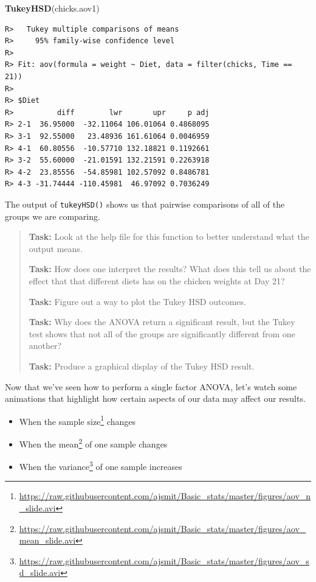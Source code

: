 \documentclass[english,10pt,a4paper,oneside]{book}
\renewcommand{\href}[2]{#2\footnote{\url{#1}}}
\let\rmarkdownfootnote\footnote%
\def\footnote{\protect\rmarkdownfootnote}
\providecommand{\tightlist}{%
  \setlength{\itemsep}{0pt}\setlength{\parskip}{0pt}}
\newenvironment{Shaded}{\begin{snugshade}}{\end{snugshade}}
\newcommand{\KeywordTok}[1]{\textcolor[rgb]{0.13,0.29,0.53}{\textbf{#1}}}
\newcommand{\NormalTok}[1]{#1}
\theoremstyle{definition}
\theoremstyle{definition}
\theoremstyle{definition}
\theoremstyle{remark}
\begin{document}
\begin{Shaded}
\begin{Highlighting}[]
\KeywordTok{TukeyHSD}\NormalTok{(chicks.aov1)}
\end{Highlighting}
\end{Shaded}

\begin{verbatim}
R>   Tukey multiple comparisons of means
R>     95% family-wise confidence level
R> 
R> Fit: aov(formula = weight ~ Diet, data = filter(chicks, Time == 21))
R> 
R> $Diet
R>          diff        lwr       upr     p adj
R> 2-1  36.95000  -32.11064 106.01064 0.4868095
R> 3-1  92.55000   23.48936 161.61064 0.0046959
R> 4-1  60.80556  -10.57710 132.18821 0.1192661
R> 3-2  55.60000  -21.01591 132.21591 0.2263918
R> 4-2  23.85556  -54.85981 102.57092 0.8486781
R> 4-3 -31.74444 -110.45981  46.97092 0.7036249
\end{verbatim}

The output of \texttt{tukeyHSD()} shows us that pairwise comparisons of
all of the groups we are comparing.

\begin{quote}
\textbf{Task:} Look at the help file for this function to better
understand what the output means.

\textbf{Task:} How does one interpret the results? What does this tell
us about the effect that that different diets has on the chicken weights
at Day 21?

\textbf{Task:} Figure out a way to plot the Tukey HSD outcomes.

\textbf{Task:} Why does the ANOVA return a significant result, but the
Tukey test shows that not all of the groups are significantly different
from one another?

\textbf{Task:} Produce a graphical display of the Tukey HSD result.
\end{quote}

Now that we've seen how to perform a single factor ANOVA, let's watch
some animations that highlight how certain aspects of our data may
affect our results.

\begin{itemize}
\tightlist
\item
  When the
  \href{https://raw.githubusercontent.com/ajsmit/Basic_stats/master/figures/aov_n_slide.avi}{sample
  size} changes
\item
  When the
  \href{https://raw.githubusercontent.com/ajsmit/Basic_stats/master/figures/aov_mean_slide.avi}{mean}
  of one sample changes
\item
  When the
  \href{https://raw.githubusercontent.com/ajsmit/Basic_stats/master/figures/aov_sd_slide.avi}{variance}
  of one sample increases
\end{itemize}
\end{document}
